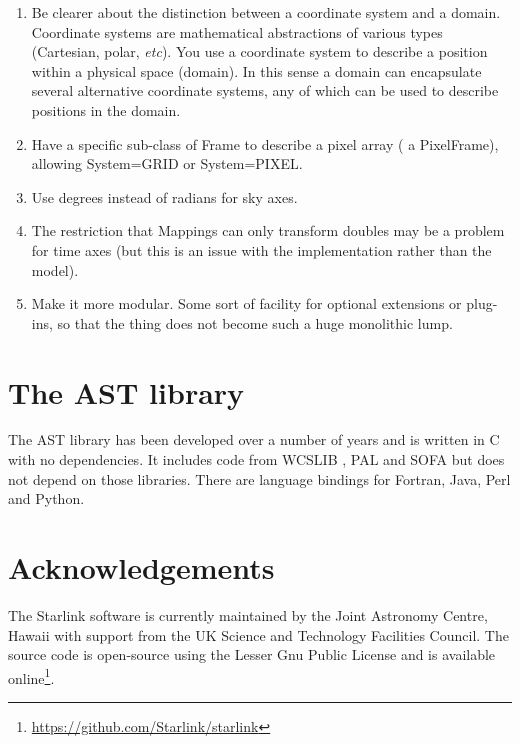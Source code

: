 \documentclass[final,authoryear,5p,times,twocolumn]{elsarticle}
\begin{document}
\begin{enumerate}

\item Be clearer about the distinction between a coordinate system and
  a domain. Coordinate systems are mathematical abstractions of
  various types (Cartesian, polar, \emph{etc}). You use a coordinate system
  to describe a position within a physical space (domain). In this
  sense a domain can encapsulate several alternative coordinate
  systems, any of which can be used to describe positions in the
  domain.

\item Have a specific sub-class of Frame to describe a pixel array ( a
  PixelFrame), allowing System=GRID or System=PIXEL.

\item Use degrees instead of radians for sky axes.

\item The restriction that Mappings can only transform doubles may be
  a problem for time axes (but this is an issue with the
  implementation rather than the model).

\item Make it more modular. Some sort of facility for optional
  extensions or plug-ins, so that the thing does not become such a
  huge monolithic lump.

\end{enumerate}

\section{The AST library}

The AST library has been developed over a number of years
\citep{1998ASPC..145...41W,2000ASPC..216..506W,2001ASPC..238..129B,2004ASPC..314..412B,2008ASPC..394..635B,2010ASPC..434..213B,2012ASPC..461..825B}
  and is written in C with no dependencies. It includes code from
  WCSLIB \citep[][]{2006ASPC..351..591C}, PAL \citep{2013ASPC..475..307J}
  and SOFA \citep[][]{2011SchpJ...611404H} but does not depend on those
  libraries. There are language bindings for Fortran, Java, Perl and
  Python.

\section{Acknowledgements}

The Starlink software is currently maintained by the Joint Astronomy
Centre, Hawaii with support from the UK Science and Technology
Facilities Council. The source code is open-source using the Lesser
Gnu Public License and is available
online\footnote{\url{https://github.com/Starlink/starlink}}.
\end{document}

